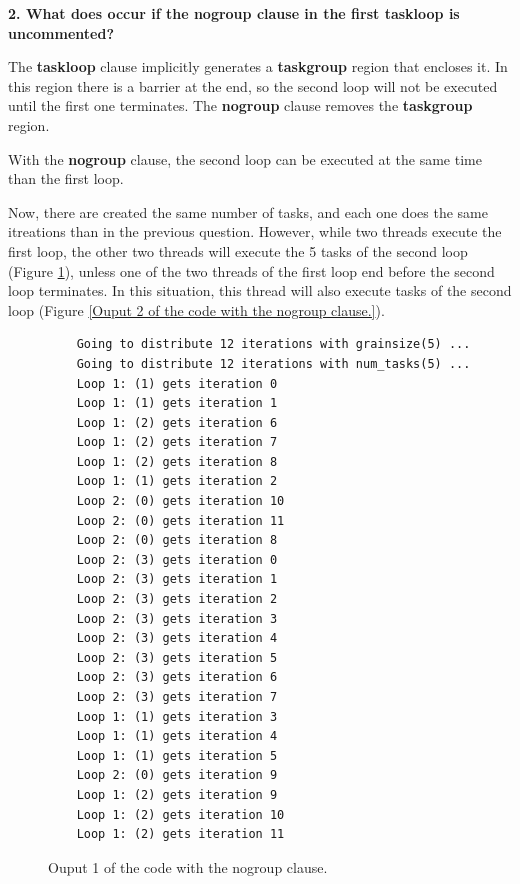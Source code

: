 \documentclass[12pt, a4paper]{article}
\begin{document}
\hfill

\textbf{2. What does occur if the nogroup clause in the first taskloop is uncommented?}

The \textbf{taskloop} clause implicitly generates a \textbf{taskgroup} region that encloses it. In this region there is a barrier at the end, so the second loop will not be executed until the first one terminates. The \textbf{nogroup} clause removes the \textbf{taskgroup} region.

With the \textbf{nogroup} clause, the second loop can be executed at the same time than the first loop.

Now, there are created the same number of tasks, and each one does the same itreations than in the previous question. However, while two threads execute the first loop, the other two threads will execute the 5 tasks of the second loop (Figure \ref{Ouput 1 of the code with the nogroup clause.}), unless one of the two threads of the first loop end before the second loop terminates. In this situation, this thread will also execute tasks of the second loop (Figure \ref{Ouput 2 of the code with the nogroup clause.}).

\begin{figure}[H]
	\begin{lstlisting}
	Going to distribute 12 iterations with grainsize(5) ...
	Going to distribute 12 iterations with num_tasks(5) ...
	Loop 1: (1) gets iteration 0
	Loop 1: (1) gets iteration 1
	Loop 1: (2) gets iteration 6
	Loop 1: (2) gets iteration 7
	Loop 1: (2) gets iteration 8
	Loop 1: (1) gets iteration 2
	Loop 2: (0) gets iteration 10
	Loop 2: (0) gets iteration 11
	Loop 2: (0) gets iteration 8
	Loop 2: (3) gets iteration 0
	Loop 2: (3) gets iteration 1
	Loop 2: (3) gets iteration 2
	Loop 2: (3) gets iteration 3
	Loop 2: (3) gets iteration 4
	Loop 2: (3) gets iteration 5
	Loop 2: (3) gets iteration 6
	Loop 2: (3) gets iteration 7
	Loop 1: (1) gets iteration 3
	Loop 1: (1) gets iteration 4
	Loop 1: (1) gets iteration 5
	Loop 2: (0) gets iteration 9
	Loop 1: (2) gets iteration 9
	Loop 1: (2) gets iteration 10
	Loop 1: (2) gets iteration 11
	\end{lstlisting}
	
	\caption{Ouput 1 of the code with the nogroup clause.}
	\label{Ouput 1 of the code with the nogroup clause.}
\end{figure}
\end{document}
